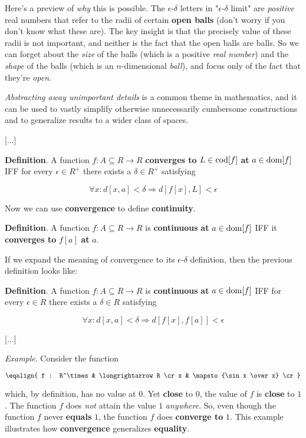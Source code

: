 Here's a preview of {\it why} this is possible. The $\epsilon$-$\delta$ letters in "$\epsilon$-$\delta$ limit" are {\it positive} real numbers that refer to the radii of certain {\bf open balls} (don't worry if you don't know what these are). The key insight is that the precisely value of these radii is not important, and neither is the fact that the open balls are balls. So we can forget about the {\it size} of the balls (which is a positive {\it real number}) and the {\it shape} of the balls (which is an $n$-dimensional {\it ball}), and focus only of the fact that they're {\it open}.

{\it Abstracting away unimportant details} is a common theme in mathematics, and it can be used to vastly simplify otherwise unnecessarily cumbersome constructions and to generalize results to a wider class of spaces.

[...]

{\bf Definition}. A function $f:A \subseteq R \longrightarrow R$ {\bf converges to} $L \in {\rm cod}[f]$ {\bf at} $a \in {\rm dom}[f]$ IFF for every $\epsilon \in R^+$ there exists a $\delta \in R^+$ satisfying

$$
\forall x: d[x,a] < \delta \Longrightarrow d[f[x], L] < \epsilon
$$

Now we can use {\bf convergence} to define {\bf continuity}.

{\bf Definition}. A function $f:A \subseteq R \longrightarrow R$ is {\bf continuous} {\bf at} $a \in {\rm dom}[f]$ IFF it {\bf converges to} $f[a]$ {\bf at} $a$.

If we expand the meaning of convergence to its $\epsilon$-$\delta$ definition, then the previous definition looks like:

{\bf Definition}. A function $f:A \subseteq R \longrightarrow R$ is {\bf continuous} {\bf at} $a \in {\rm dom}[f]$ IFF for every $\epsilon \in R$ there exists a $\delta \in R$ satisfying

$$
\forall x: d[x,a] < \delta \Longrightarrow d[f[x], f[a]] < \epsilon
$$



[...]

{\it Example}. Consider the function

$$\eqalign{
  f : R^\times & \longrightarrow R \cr
  x            & \mapsto {\sin x \over x} \cr
}$$

which, by definition, has no value at $0$. Yet {\bf close} to $0$, the value of $f$ is {\bf close} to $1$. The function $f$ does {\it not} attain the value $1$ {\it anywhere}. So, even though the function $f$ never {\bf equals} $1$, the function $f$ does {\bf converge to} $1$. This example illustrates how {\bf convergence} generalizes {\bf equality}.

